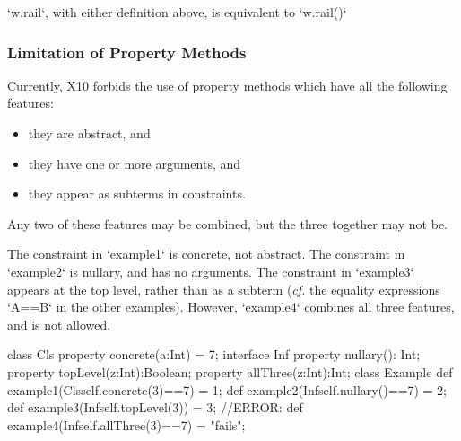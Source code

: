 \xcd`w.rail`, with either definition above, 
is equivalent to 
\xcd`w.rail()`


\subsubsection{Limitation of Property Methods}

\limitationx{} 
Currently, X10 forbids the use of property methods which have all the
following features: 
\begin{itemize}
\item they are abstract, and
\item they have one or more arguments, and
\item they appear as subterms in constraints.
\end{itemize}
Any two of these features may be combined, but the three together may not be. 

\begin{ex} 
The constraint in \xcd`example1` is concrete, not abstract.  The constraint in
\xcd`example2` is nullary, and has no arguments.  The constraint in
\xcd`example3` appears at the top level, rather than as a subterm ({\em cf.}
the equality expressions \xcd`A==B` in the other examples).    However,
\xcd`example4` combines all three features, and is not allowed.
\begin{xten}
class Cls {
  property concrete(a:Int) = 7;
}
interface Inf {
  property nullary(): Int;
  property topLevel(z:Int):Boolean;
  property allThree(z:Int):Int;
}
class Example{
  def example1(Cls{self.concrete(3)==7}) = 1;
  def example2(Inf{self.nullary()==7})   = 2;
  def example3(Inf{self.topLevel(3)})    = 3;
  //ERROR: def example4(Inf{self.allThree(3)==7}) = "fails";
}
\end{xten}
%
\end{ex}


